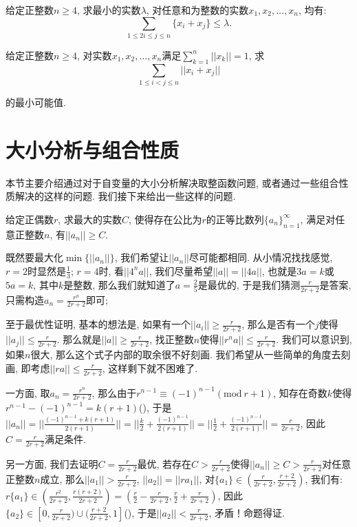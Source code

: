 \documentclass[lang=cn,12pt,thmcnt=section]{elegantbook}
\renewcommand{\note}[1]{({\kaishu\dashuline{#1}})}
\begin{document}
\begin{exercise}
给定正整数$n\ge 4$, 求最小的实数$\lambda$, 对任意和为整数的实数$x_1,x_2,\dots{},x_n$, 均有: 
\[
\sum_{1\le 2i\le j\le n}\{x_i+x_j\}\le \lambda.
\]
\end{exercise}

\begin{exercise}
给定正整数$n\ge 4$, 对实数$x_1,x_2,\dots{},x_n$满足$\sum\limits_{k=1}^n ||x_k||=1$, 求
\[
\sum_{1\le i<j\le n}||x_i+x_j||
\]

的最小可能值.
\end{exercise}

\section{大小分析与组合性质}
本节主要介绍通过对于自变量的大小分析解决取整函数问题, 或者通过一些组合性质解决的这样的问题. 我们接下来给出一些这样的问题.

\begin{example}
给定正偶数$r$, 求最大的实数$C$, 使得存在公比为$r$的正等比数列$\{a_n\}_{n=1}^{\infty}$, 满足对任意正整数$n$, 有$||a_n||\ge C$.
\end{example}

\begin{analysis}
既然要最大化$\min\{||a_n||\}$, 我们希望让$||a_n||$尽可能都相同. 从小情况找找感觉, $r=2$时显然是$\frac{1}{3}$; $r=4$时, 看$||4^{n}a||$, 我们尽量希望$||a||=||4a||$, 也就是$3a=k$或$5a=k$, 其中$k$是整数, 那么我们就知道了$a=\frac{2}{5}$是最优的, 于是我们猜测$\frac{r}{2r+2}$是答案, 只需构造$a_n=\frac{r^n}{2r+2}$即可; 

至于最优性证明, 基本的想法是, 如果有一个$||a_i||\ge \frac{r}{2r+2}$, 那么是否有一个$j$使得$||a_j||\le \frac{r}{2r+2}$. 那么就是$||a||\ge \frac{r}{2r+2}$, 找正整数$n$使得$||r^na||\le  \frac{r}{2r+2}$. 我们可以意识到, 如果$n$很大, 那么这个式子内部的取余很不好刻画. 我们希望从一些简单的角度去刻画, 即考虑$||ra||\le \frac{r}{2r+2}$, 这样剩下就不困难了.
\end{analysis}

\begin{solution}
一方面, 取$a_n=\frac{r^n}{2r+2}$, 那么由于$r^{n-1}\equiv (-1)^{n-1}(\mathrm{mod}\ r+1)$, 知存在奇数$k$使得$r^{n-1}-(-1)^{n-1}=k(r+1)$\note{因为$r+1$是奇数}, 于是$||a_n||=||\frac{(-1)^{n-1}+k(r+1)}{2(r+1)}||=||\frac{k}{2}+\frac{(-1)^{n-1}}{2(r+1)}||=||\frac{1}{2}+\frac{(-1)^{n-1}}{2(r+1)}||=\frac{r}{2r+2}$, 因此$C=\frac{r}{2r+2}$满足条件.

另一方面, 我们去证明$C=\frac{r}{2r+2}$最优, 若存在$C>\frac{r}{2r+2}$使得$||a_n||\ge C>\frac{r}{2r+2}$对任意正整数$n$成立, 那么$||a_1||>\frac{r}{2r+2}$, $||a_2||=||ra_1||$, 对$\{a_1\}\in (\frac{r}{2r+2},\frac{r+2}{2r+2})$, 我们有: $r\{a_1\}\in (\frac{r^2}{2r+2},\frac{r(r+2)}{2r+2})=(\frac{r}{2}-\frac{r}{2r+2},\frac{r}{2}+\frac{r}{2r+2})$, 因此$\{a_2\}\in [0,\frac{r}{2r+2})\cup (\frac{r+2}{2r+2},1]$\note{因为$r$是整数}, 于是$||a_2||<\frac{r}{2r+2}$, 矛盾！命题得证.
\end{solution}
\end{document}
